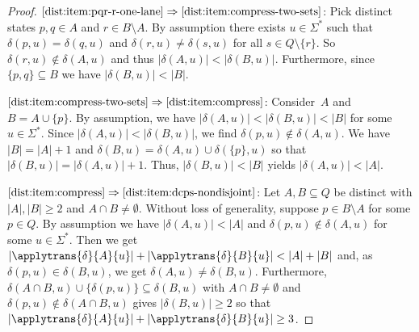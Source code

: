 \begin{proof}
	$\ref{dist:item:pqr-r-one-lane} \Rightarrow \ref{dist:item:compress-two-sets}$: Pick distinct states $p,q \in A$ and $r \in B \setminus A$.
	By assumption there exists $u \in \Sigma^*$
	such that $\delta(p, u) = \delta(q, u)$
	and $\delta(r, u) \ne \delta(s, u)$ for all $s \in Q \setminus \{r\}$.
	So $\delta(r, u) \notin \delta(A, u)$
	and thus $|\delta(A, u)| < |\delta(B, u)|$.
	Furthermore, since $\{p,q\} \subseteq B$
	we have $|\delta(B, u)| < |B|$.
	
	$\ref{dist:item:compress-two-sets} \Rightarrow \ref{dist:item:compress}$: 
	Consider~$A$ and $B = A \cup \{p\}$.
	By assumption, we have $|\delta(A, u)| < |\delta(B, u)| < |B|$
	for some $u \in \Sigma^*$.
	Since $|\delta(A, u)| < |\delta(B, u)|$,
	we find $\delta(p, u) \notin \delta(A, u)$.	
	We have $|B| = |A| + 1$ and $\delta(B, u) = \delta(A, u) \cup \delta(\{p\}, u)$
	so that $|\delta(B, u)| = |\delta(A, u)| + 1$.
	Thus,  $|\delta(B, u)| < |B|$
	yields $|\delta(A, u)| < |A|$.
			
	$\ref{dist:item:compress} \Rightarrow \ref{dist:item:dcps-nondisjoint}$:
	Let $A, B \subseteq Q$ be distinct with $|A|, |B| \ge 2$ and $A \cap B \ne \emptyset$.
	Without loss of generality, suppose $p \in B \setminus A$ for some $p \in Q$.
	By assumption we have $|\delta(A, u)| < |A|$
	and $\delta(p, u) \notin \delta(A, u)$ for some $u \in \Sigma^*$.
	Then we get $|\applytrans{\delta}{A}{u}| + |\applytrans{\delta}{B}{u}| < |A| + |B|$
	and, as $\delta(p, u) \in \delta(B, u)$, we get
	$\delta(A, u) \ne \delta(B, u)$.
	Furthermore, $\delta(A \cap B, u) \cup \{\delta(p,u)\} \subseteq \delta(B, u)$ with $A \cap B \ne \emptyset$ and $\delta(p, u) \notin \delta(A \cap B, u)$ gives $|\delta(B, u)| \ge 2$ so that $|\applytrans{\delta}{A}{u}| + |\applytrans{\delta}{B}{u}| \ge 3$.
	

\end{proof}
